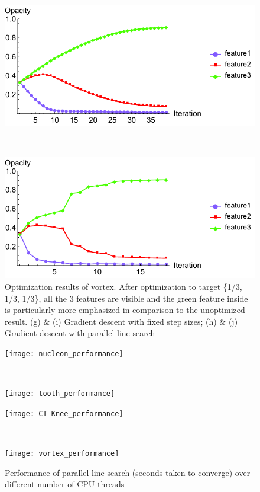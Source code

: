 \begin{figure}
	\begin{minipage}{.49\textwidth}
		\includegraphics[width=1\linewidth]{figures/vortex_naive_proportional_opacity_fixed}
		\subcaption{}
	\end{minipage}~
	\begin{minipage}{.49\textwidth}
		\includegraphics[width=1\linewidth]{figures/vortex_naive_proportional_opacity_parallelsearch}
		\subcaption{}
	\end{minipage}
	\caption[Optimization results of vortex]{Optimization results of vortex. After optimization to target \{1/3, 1/3, 1/3\}, all the 3 features are visible and the green feature inside is particularly more emphasized in comparison to the unoptimized result. (g) \& (i) Gradient descent with fixed step sizes; (h) \& (j) Gradient descent with parallel line search}
	\label{fig:vortex_naive_optimized}
\end{figure}

\begin{figure}
	\centering
	\begin{minipage}{.5\textwidth}
		\texttt{[image: nucleon\_performance]}
	\end{minipage}~
	\begin{minipage}{.5\textwidth}
		\texttt{[image: tooth\_performance]}
	\end{minipage}
	\begin{minipage}{.5\textwidth}
		\texttt{[image: CT-Knee\_performance]}
	\end{minipage}~
	\begin{minipage}{.5\textwidth}
		\texttt{[image: vortex\_performance]}
	\end{minipage}
	\caption[Performance of parallel line search]{Performance of parallel line search (seconds taken to converge) over different number of CPU threads}
	\label{fig:parallelsearch_performance}
\end{figure}

